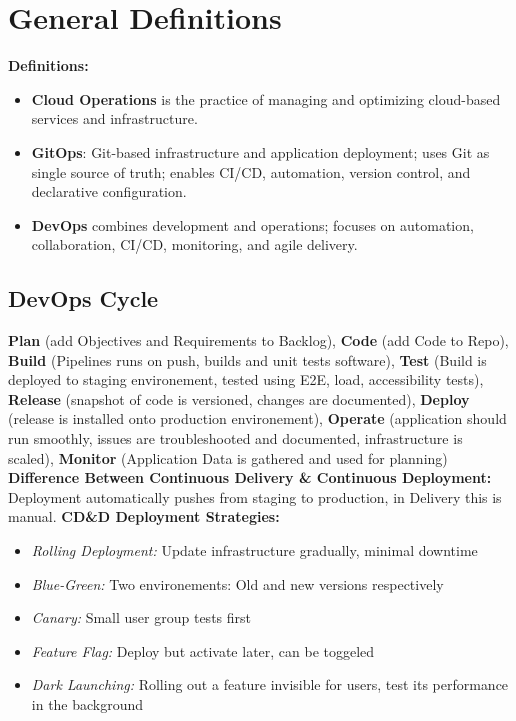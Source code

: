 \section{General Definitions}
\textbf{Definitions:}
\begin{itemize}

	\item \textbf{Cloud Operations} is the practice of managing and optimizing cloud-based services and infrastructure.
	\item \textbf{GitOps}: Git-based infrastructure and application deployment; uses Git as single source of truth; enables CI/CD, automation, version control, and declarative configuration.

	\item \textbf{DevOps} combines development and operations; focuses on automation, collaboration, CI/CD, monitoring, and agile delivery.
\end{itemize}
\subsection{DevOps Cycle}
\textbf{Plan} (add Objectives and Requirements to Backlog), \textbf{Code} (add Code to Repo), \textbf{Build} (Pipelines runs on push, builds and unit tests software), \textbf{Test} (Build is deployed to staging environement, tested using E2E, load, accessibility tests), \textbf{Release} (snapshot of code is versioned, changes are documented), \textbf{Deploy} (release is installed onto production environement), \textbf{Operate} (application should run smoothly, issues are troubleshooted and documented, infrastructure is scaled), \textbf{Monitor} (Application Data is gathered and used for planning)
\textbf{Difference Between Continuous Delivery \& Continuous Deployment:} Deployment automatically pushes from staging to production, in Delivery this is manual.
\textbf{CD\&D Deployment Strategies:} \begin{itemize}
	\item \textit{Rolling Deployment:} Update infrastructure gradually, minimal downtime

	\item \textit{Blue-Green:} Two environements: Old and new versions respectively

	\item \textit{Canary:} Small user group tests first

	\item \textit{Feature Flag:} Deploy but activate later, can be toggeled

	\item \textit{Dark Launching:} Rolling out a feature invisible for users, test its performance in the background
\end{itemize}
